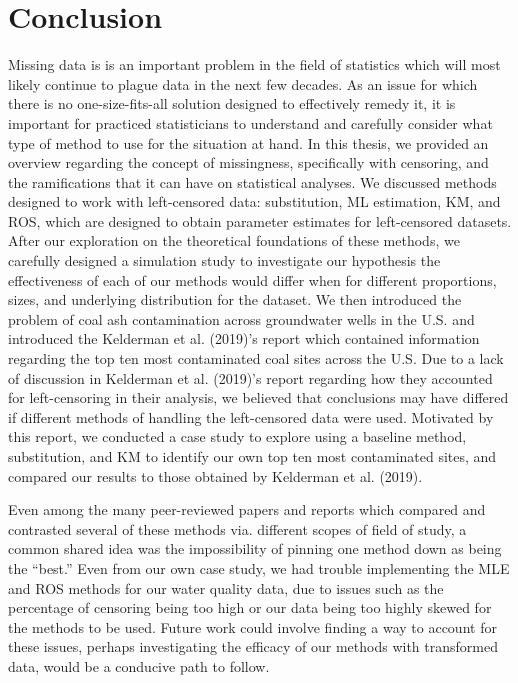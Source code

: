\documentclass[12pt, twoside]{amherstthesis}
\begin{document}
\hypertarget{conclusion}{%
\chapter{Conclusion}\label{conclusion}}

Missing data is is an important problem in the field of statistics which will most likely continue to plague data in the next few decades. As an issue for which there is no one-size-fits-all solution designed to effectively remedy it, it is important for practiced statisticians to understand and carefully consider what type of method to use for the situation at hand. In this thesis, we provided an overview regarding the concept of missingness, specifically with censoring, and the ramifications that it can have on statistical analyses. We discussed methods designed to work with left-censored data: substitution, ML estimation, KM, and ROS, which are designed to obtain parameter estimates for left-censored datasets. After our exploration on the theoretical foundations of these methods, we carefully designed a simulation study to investigate our hypothesis the effectiveness of each of our methods would differ when for different proportions, sizes, and underlying distribution for the dataset. We then introduced the problem of coal ash contamination across groundwater wells in the U.S. and introduced the Kelderman et al. (2019)'s report which contained information regarding the top ten most contaminated coal sites across the U.S. Due to a lack of discussion in Kelderman et al. (2019)'s report regarding how they accounted for left-censoring in their analysis, we believed that conclusions may have differed if different methods of handling the left-censored data were used. Motivated by this report, we conducted a case study to explore using a baseline method, substitution, and KM to identify our own top ten most contaminated sites, and compared our results to those obtained by Kelderman et al. (2019).

Even among the many peer-reviewed papers and reports which compared and contrasted several of these methods via. different scopes of field of study, a common shared idea was the impossibility of pinning one method down as being the ``best.'' Even from our own case study, we had trouble implementing the MLE and ROS methods for our water quality data, due to issues such as the percentage of censoring being too high or our data being too highly skewed for the methods to be used. Future work could involve finding a way to account for these issues, perhaps investigating the efficacy of our methods with transformed data, would be a conducive path to follow.
\end{document}
